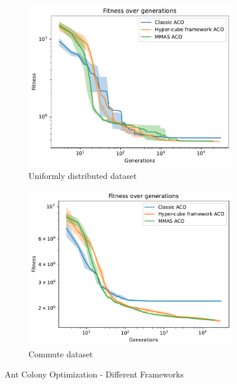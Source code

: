 \begin{figure}
    \centering
    \begin{subfigure}[b]{0.9\textwidth}
        \includegraphics[width=\textwidth]{img/aco_compareas_random.pdf}
        \caption{Uniformly distributed dataset}
        \label{fig:aco_as_random}
    \end{subfigure}
    \begin{subfigure}[b]{0.9\textwidth}
        \includegraphics[width=\textwidth]{img/aco_compareas_commute.pdf}
        \caption{Commute dataset}
        \label{fig:aco_as_commute}
    \end{subfigure}
    \caption{Ant Colony Optimization - Different Frameworks}
    \label{fig:aco_ant_systems}
\end{figure}